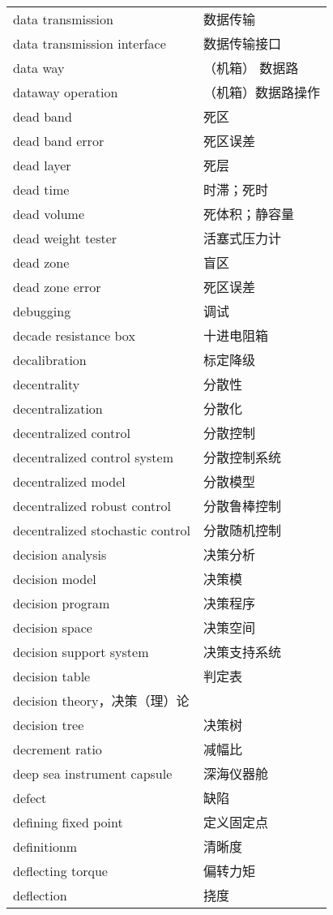\documentclass[
]{article}
\begin{document}
\begin{longtable}[]{@{}ll@{}}
data transmission & 数据传输 \\
data transmission interface & 数据传输接口 \\
data way & （机箱） 数据路 \\
dataway operation & （机箱）数据路操作 \\
dead band & 死区 \\
dead band error & 死区误差 \\
dead layer & 死层 \\
dead time & 时滞；死时 \\
dead volume & 死体积；静容量 \\
dead weight tester & 活塞式压力计 \\
dead zone & 盲区 \\
dead zone error & 死区误差 \\
debugging & 调试 \\
decade resistance box & 十进电阻箱 \\
decalibration & 标定降级 \\
decentrality & 分散性 \\
decentralization & 分散化 \\
decentralized control & 分散控制 \\
decentralized control system & 分散控制系统 \\
decentralized model & 分散模型 \\
decentralized robust control & 分散鲁棒控制 \\
decentralized stochastic control & 分散随机控制 \\
decision analysis & 决策分析 \\
decision model & 决策模 \\
decision program & 决策程序 \\
decision space & 决策空间 \\
decision support system & 决策支持系统 \\
decision table & 判定表 \\
decision theory，决策（理）论 & \\
decision tree & 决策树 \\
decrement ratio & 减幅比 \\
deep sea instrument capsule & 深海仪器舱 \\
defect & 缺陷 \\
defining fixed point & 定义固定点 \\
definitionm & 清晰度 \\
deflecting torque & 偏转力矩 \\
deflection & 挠度 \\

\end{longtable}
\end{document}
